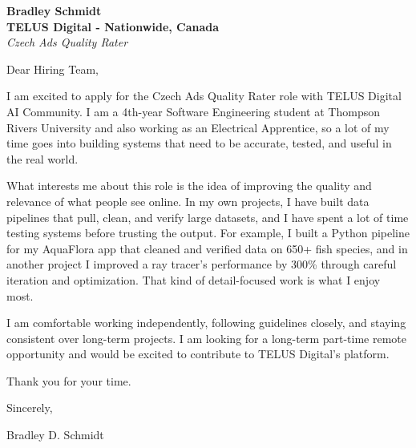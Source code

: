 \documentclass[11pt]{article}
\begin{document}
\textbf{Bradley Schmidt}\\
\vspace{0.5em}
\textbf{TELUS Digital - Nationwide, Canada}\\
\textit{Czech Ads Quality Rater}

Dear Hiring Team,

\par

I am excited to apply for the Czech Ads Quality Rater role with TELUS Digital AI Community. I am a 4th-year Software Engineering student at Thompson Rivers University and also working as an Electrical Apprentice, so a lot of my time goes into building systems that need to be accurate, tested, and useful in the real world.

\par

What interests me about this role is the idea of improving the quality and relevance of what people see online. In my own projects, I have built data pipelines that pull, clean, and verify large datasets, and I have spent a lot of time testing systems before trusting the output. For example, I built a Python pipeline for my AquaFlora app that cleaned and verified data on 650+ fish species, and in another project I improved a ray tracer's performance by 300\% through careful iteration and optimization. That kind of detail-focused work is what I enjoy most.

\par

I am comfortable working independently, following guidelines closely, and staying consistent over long-term projects. I am looking for a long-term part-time remote opportunity and would be excited to contribute to TELUS Digital's platform.

\par

Thank you for your time.

\par

Sincerely,

\par

Bradley D. Schmidt
\end{document}
